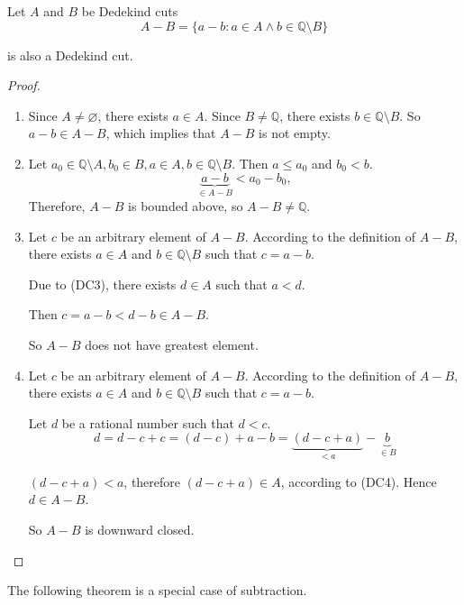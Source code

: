 \begin{theorem}[Subtraction]
    \par Let $A$ and $B$ be Dedekind cuts
    \[
        A - B = \{ a - b: a\in A\land b\in\mathbb{Q}\setminus B \}
    \]
    \par is also a Dedekind cut.
\end{theorem}

\begin{proof}
    \begin{enumerate}[label = (\roman*)]
        \item Since $A\ne\varnothing$, there exists $a\in A$. Since $B\ne\mathbb{Q}$, there exists $b\in\mathbb{Q}\setminus B$. So $a - b\in A - B$, which implies that $A - B$ is not empty.
        \item Let $a_{0}\in\mathbb{Q}\setminus A, b_{0}\in B, a\in A, b\in\mathbb{Q}\setminus B$. Then $a\le a_{0}$ and $b_{0} < b$.
              \[
                  \underbrace{a - b}_{\in A - B} < a_{0} - b_{0},
              \]
              Therefore, $A - B$ is bounded above, so $A - B\ne\mathbb{Q}$.
        \item Let $c$ be an arbitrary element of $A - B$. According to the definition of $A - B$, there exists $a\in A$ and $b\in\mathbb{Q}\setminus B$ such that $c = a - b$.
              \par Due to (DC3), there exists $d\in A$ such that $a < d$.
              \par Then $c = a - b < d - b \in A - B$.
              \par So $A - B$ does not have greatest element.
        \item Let $c$ be an arbitrary element of $A - B$. According to the definition of $A - B$, there exists $a\in A$ and $b\in\mathbb{Q}\setminus B$ such that $c = a - b$.
              \par Let $d$ be a rational number such that $d < c$.
              \[
                  d = d - c + c = (d - c) + a - b = \underbrace{(d - c + a)}_{< a} - \underbrace{b}_{\in B}
              \]
              \par $(d - c + a) < a$, therefore $(d - c + a)\in A$, according to (DC4). Hence $d\in A - B$.
              \par So $A - B$ is downward closed.
    \end{enumerate}
\end{proof}

\par The following theorem is a special case of subtraction.

